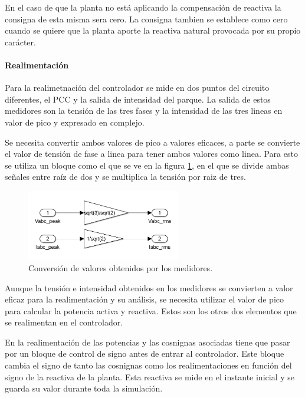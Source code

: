 \documentclass{book}
\begin{document}
En el caso de que la planta no est\'a aplicando la compensaci\'on de reactiva la consigna de esta misma sera cero. La consigna tambien se establece como cero cuando se quiere que la planta aporte la reactiva natural provocada por su propio car\'acter. \par

\paragraph{Realimentaci\'on}

Para la realimetnaci\'on del controlador se mide en dos puntos del circuito diferentes, el PCC y la salida de intensidad del parque. La salida de estos medidores son la tensi\'on de las tres fases y la intensidad de las tres lineas en valor de pico y expresado en complejo. \par

Se necesita convertir ambos valores de pico a valores eficaces, a parte se convierte el valor de tensi\'on de fase a linea para tener ambos valores como linea. Para esto se utiliza un bloque como el que se ve en la figura \ref{peak2rms}, en el que se divide ambas señales entre ra\'iz de dos y se multiplica la tensi\'on por raiz de tres. \par

\begin{figure}[h!]
\centering
\includegraphics[width=0.6\textwidth]{peak2rms.PNG}
\caption{Conversi\'on de valores obtenidos por los medidores. }
\label{peak2rms}
\end{figure} \par

Aunque la tensi\'on e intensidad obtenidos en los medidores se convierten a valor eficaz para la realimentaci\'on y su an\'alisis, se necesita utilizar el valor de pico para calcular la potencia activa y reactiva. Estos son los otros dos elementos que se realimentan en el controlador.  \par

En la realimentaci\'on de las potencias y las cosnignas asociadas tiene que pasar por un bloque de control de signo antes de entrar al controlador. Este bloque cambia el signo de tanto las cosnignas como los realimentaciones en funci\'on del signo de la reactiva de la planta. Esta reactiva se mide en el instante inicial y se guarda su valor durante toda la simulaci\'on. \par
\end{document}
